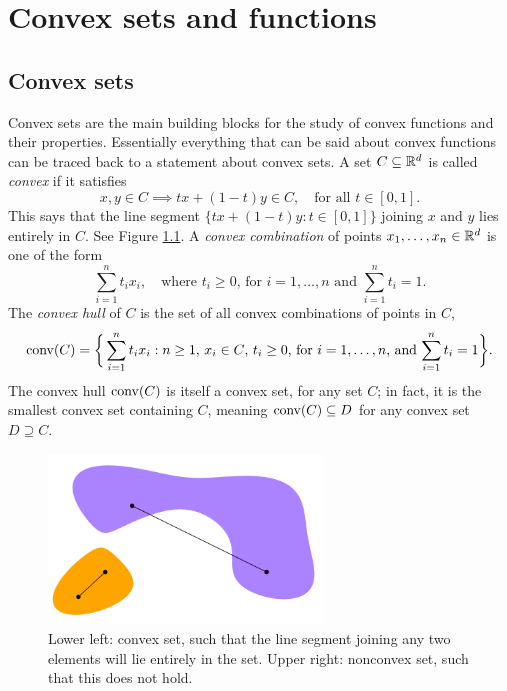 \chapter{Convex sets and functions}
\label{chap:convex_sets_functions}

\section{Convex sets}  
\label{sec:convex_sets}

Convex sets are the main building blocks for the study of convex functions and
their properties. Essentially everything that can be said about convex
functions can be traced back to a statement about convex sets. A set $C
\subseteq \mathbb{R}^d$ is called \emph{convex} if it satisfies 
\begin{equation}
\label{eq:convex_set}
x, y \in C \implies t x + (1-t) y \in C, \quad \text{for all $t \in [0,1]$}. 
\end{equation}
This says that the line segment $\{ tx + (1-t) y : t \in [0,1] \}$ joining $x$
and $y$ lies entirely in $C$. See Figure \ref{fig:convex_set}. A \emph{convex 
  combination} of points $x_1,\ldots,x_n \in \mathbb{R}^d$ is one of the form   
\[
\sum_{i=1}^n t_i x_i, \quad \text{where $t_i \geq 0$, for $i=1,\ldots,n$ and 
  $\sum_{i=1}^n t_i = 1$}. 
\] 
The \emph{convex hull} of $C$ is the set of all convex combinations of points in
$C$, 
\[ 
\operatorname{conv}(C) = \bigg\{
\sum_{i=1}^n t_i x_i : 
\text{$n \geq 1$, $x_i \in C$, $t_i \geq 0$, for $i=1,\ldots,n$, and 
  $\sum_{i=1}^n t_i = 1$} \bigg\}. 
\]
The convex hull $\operatorname{conv}(C)$ is itself a convex set, for any set $C$; in fact, it
is the smallest convex set containing $C$, meaning $\operatorname{conv}(C) \subseteq D$ for 
any convex set $D \supseteq C$. 

\begin{figure}[tb]
\centering
\includegraphics[width=0.65\textwidth]{fig/convex_set.pdf}
\caption{Lower left: convex set, such that the line segment joining any two 
  elements will lie entirely in the set. Upper right: nonconvex set, such
  that this does not hold.} 
\label{fig:convex_set}
\end{figure}

